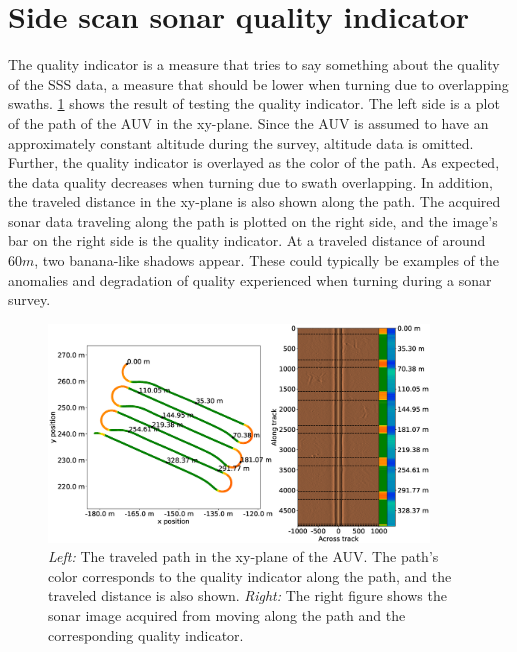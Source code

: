 \section{Side scan sonar quality indicator}

The quality indicator is a measure that tries to say something about the quality of the SSS data, a measure that should be lower when turning due to overlapping swaths. \cref{fig:path_and_quality_ind} shows the result of testing the quality indicator. The left side is a plot of the path of the AUV in the xy-plane. Since the AUV is assumed to have an approximately constant altitude during the survey, altitude data is omitted. Further, the quality indicator is overlayed as the color of the path. As expected, the data quality decreases when turning due to swath overlapping. In addition, the traveled distance in the xy-plane is also shown along the path. The acquired sonar data traveling along the path is plotted on the right side, and the image's bar on the right side is the quality indicator. At a traveled distance of around $60 m$, two banana-like shadows appear. These could typically be examples of the anomalies and degradation of quality experienced when turning during a sonar survey. 

\begin{figure} %
  \centering
  \includegraphics[trim=0cm 2cm 5.5cm 3cm, clip=true, width=0.9\textwidth]{figures/path_and_quality_indicator.eps}
  \caption[Path with quality indicator overlayed]{\textit{Left:} The traveled path in the xy-plane of the AUV. The path's color corresponds to the quality indicator along the path, and the traveled distance is also shown. \textit{Right:} The right figure shows the sonar image acquired from moving along the path and the corresponding quality indicator.}
  \label{fig:path_and_quality_ind}
\end{figure}

